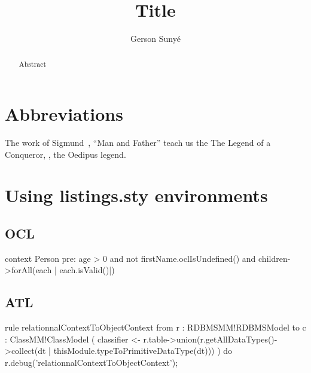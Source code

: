 \documentclass{article}
\title{Title}
\author{Gerson Sunyé}
\begin{document}
\maketitle

\begin{abstract}
    Abstract
\end{abstract}

\section{Abbreviations}

The work of Sigmund~\etal{}, \eg{} ``Man and Father'' teach us the The Legend of a Conqueror, \ie{}, the Oedipus legend.

\section{Using listings.sty environments}

\subsection{OCL}

\begin{ocl}
context Person
pre: 
	age > 0 and 
	not firstName.oclIsUndefined() and
	children->forAll(each | each.isValid()|)
\end{ocl}



\subsection{ATL}

\begin{atl}
rule relationnalContextToObjectContext {
	from
		r : RDBMSMM!RDBMSModel
	to
		c : ClassMM!ClassModel (
            classifier <- r.table->union(r.getAllDataTypes()->collect(dt | thisModule.typeToPrimitiveDataType(dt)))
		)
	do {
		r.debug('relationnalContextToObjectContext');
	}
}
\end{atl}
\end{document}
